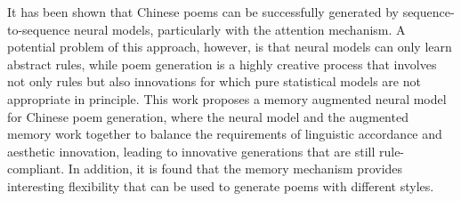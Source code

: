 It has been shown that Chinese poems can be successfully generated by sequence-to-sequence neural models, particularly with the attention mechanism. A potential problem of this approach, however, is that neural models can only learn abstract rules, while poem generation is a highly creative process that involves not only rules but also innovations for which pure statistical models are not appropriate in principle. This work proposes a memory augmented neural model for Chinese poem generation, where the neural model and the augmented memory work together to balance the requirements of linguistic accordance and aesthetic innovation, leading to innovative generations that are still rule-compliant. In addition, it is found that the memory mechanism provides interesting flexibility that can be used to generate poems with different styles.
